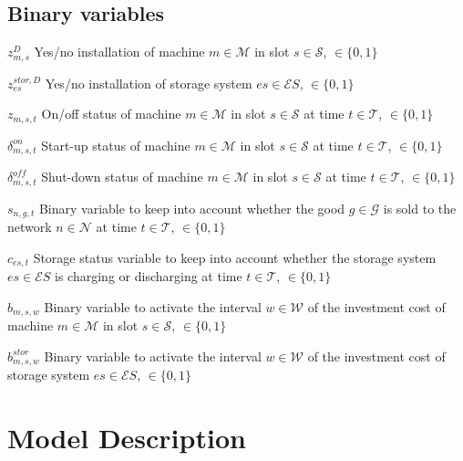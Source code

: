 \documentclass{article}
\newcommand{\cT}{{\mathcal T}}
\newcommand{\cM}{{\mathcal M}}
\newcommand{\cS}{{\mathcal S}}
\newcommand{\cES}{{\mathcal ES}}
\newcommand{\cN}{{\mathcal N}}
\newcommand{\cG}{{\mathcal G}}
\newcommand{\cW}{{\mathcal W}}
\newcommand\mydescriptionopt{
	\IEEEsetlabelwidth{$g \in \cG_{\textit{off}}^0$]}
	\IEEEusemathlabelsep
}
\begin{document}
\subsection{Binary variables}
\begin{IEEEdescription}[\mydescriptionopt]
	\item[$z_{m, s}^D$] Yes/no installation of machine $m \in \cM$ in slot $s \in \cS$, $\in \{0,1\}$
	\item[$z_{es}^{stor, D}$] Yes/no installation of storage system $es \in \cES$, $\in \{0,1\}$
	
	\item[$z_{m, s, t}$] On/off status of machine $m \in \cM$ in slot $s \in \cS$ at time $t \in \cT$, $\in \{0,1\}$
	\item[$\delta_{m, s, t}^{on}$] Start-up status of machine $m \in \cM$ in slot $s \in \cS$ at time $t \in \cT$, $\in \{0,1\}$
	\item[$\delta_{m, s, t}^{off}$] Shut-down status of machine $m \in \cM$ in slot $s \in \cS$ at time $t \in \cT$, $\in \{0,1\}$
	
	\item[$s_{n, g, t}$] Binary variable to keep into account whether the good $g \in \cG$ is sold to the network $n \in \cN$ at time $t \in \cT$, $\in \{0,1\}$
	
	\item[$c_{es, t}$] Storage status variable to keep into account whether the storage system $es \in \cES$ is charging or discharging at time $t \in \cT$, $\in \{0,1\}$
	
	\item[$b_{m, s, w}$] Binary variable to activate the interval $w \in \cW$ of the investment cost of machine $m \in \cM$ in slot $s \in \cS$, $\in \{0,1\}$
	\item[$b_{m, s, w}^{stor}$] Binary variable to activate the interval $w \in \cW$ of the investment cost of storage system $es \in \cES$, $\in \{0,1\}$
	

\end{IEEEdescription}


\section{Model Description}
\end{document}
